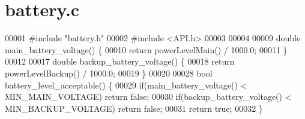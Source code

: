 \section{battery.\+c}
\label{battery_8c_source}

\begin{DoxyCode}
00001 \textcolor{preprocessor}{#include "battery.h"}
00002 \textcolor{preprocessor}{#include <API.h>}
00003 
00004 
00009 \textcolor{keywordtype}{double} main_battery_voltage() \{
00010   \textcolor{keywordflow}{return} powerLevelMain() / 1000.0;
00011 \}
00012 
00017 \textcolor{keywordtype}{double} backup_battery_voltage() \{
00018   \textcolor{keywordflow}{return} powerLevelBackup() / 1000.0;
00019 \}
00020 
00028 \textcolor{keywordtype}{bool} battery_level_acceptable() \{
00029   \textcolor{keywordflow}{if}(main_battery_voltage() < MIN_MAIN_VOLTAGE) \textcolor{keywordflow}{return} \textcolor{keyword}{false};
00030   \textcolor{keywordflow}{if}(backup_battery_voltage() < MIN_BACKUP_VOLTAGE) \textcolor{keywordflow}{return} \textcolor{keyword}{false};
00031   \textcolor{keywordflow}{return} \textcolor{keyword}{true};
00032 \}
\end{DoxyCode}
